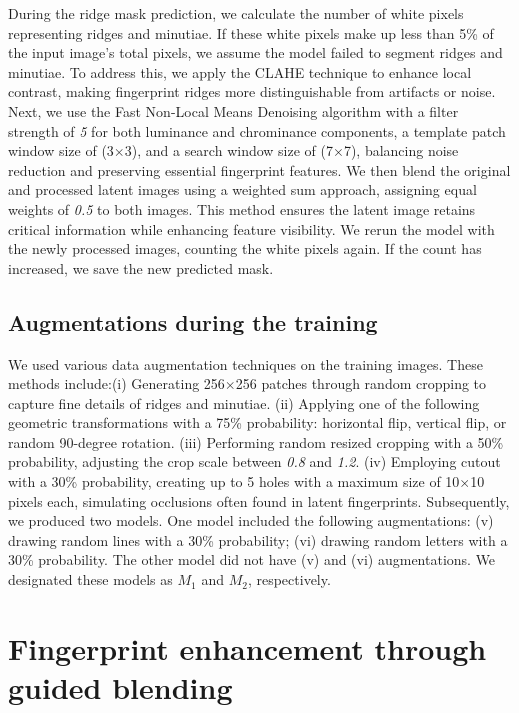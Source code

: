 \documentclass[twocolumn, switch]{article} %
\begin{document}
During the ridge mask prediction, we calculate the number of white pixels representing ridges and minutiae. If these white pixels make up less than 5\% of the input image's total pixels, we assume the model failed to segment ridges and minutiae. To address this, we apply the CLAHE technique \cite{pizer1987adaptive} to enhance local contrast, making fingerprint ridges more distinguishable from artifacts or noise. Next, we use the Fast Non-Local Means Denoising algorithm \cite{buades2011non} with a filter strength of \textit{5} for both luminance and chrominance components, a template patch window size of (3$\times$3), and a search window size of (7$\times$7), balancing noise reduction and preserving essential fingerprint features. We then blend the original and processed latent images using a weighted sum approach, assigning equal weights of \textit{0.5} to both images. This method ensures the latent image retains critical information while enhancing feature visibility. We rerun the model with the newly processed images, counting the white pixels again. If the count has increased, we save the new predicted mask.



\subsection{Augmentations during the training}
\label{aug}

We used various data augmentation techniques on the training images. These methods include:(i) Generating 256$\times$256 patches through random cropping to capture fine details of ridges and minutiae. (ii) Applying one of the following geometric transformations with a 75\% probability: horizontal flip, vertical flip, or random 90-degree rotation. (iii) Performing random resized cropping with a 50\% probability, adjusting the crop scale between \textit{0.8} and \textit{1.2}. (iv) Employing cutout with a 30\% probability, creating up to 5 holes with a maximum size of 10$\times$10 pixels each, simulating occlusions often found in latent fingerprints. Subsequently, we produced two models. One model included the following augmentations: (v) drawing random lines with a 30\% probability; (vi) drawing random letters with a 30\% probability. The other model did not have (v) and (vi) augmentations. We designated these models as $M_1$ and $M_2$, respectively.

\section{Fingerprint enhancement through guided blending}
\end{document}
